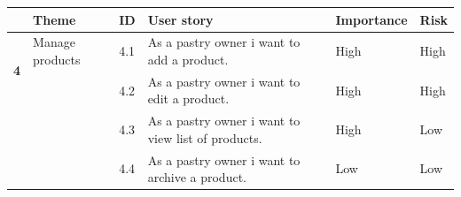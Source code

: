 \documentclass[12pt,a4paper]{report}
\begin{document}
	\begin{table}[H]
		\begin{center}
			\captionsetup[table]{skip=10pt}
			\setlength\doublerulesep{0.5pt}
			\begin{tabular}{|  p{1cm}|  p{4cm}|  p{1cm}| p{5cm}|  p{2cm}| p{2cm}|}
				\hline 
				\rowcolor{LightCyan}
				\textbf{ } & \textbf{Theme} & \textbf{ID} & \textbf{User story} & \textbf{Importance} & \textbf{Risk} 
				\\ \hline
				\multirow{2}{*}{\textbf{4} }
				&                        
				Manage products &                        
				4.1 &                        
				As a pastry owner i want to add a product.&                        
				High &                        
				High
				\\
				\cline{3-6}
				&                        
				&                        
				4.2 &                        
				As a pastry owner i want to edit a product.&                        
				High &                        
				High
				\\
				\cline{3-6}
				&                        
				&                        
				4.3 &                        
				As a pastry owner i want to view list of products.&                        
				High &                        
				Low
				\\
				\cline{3-6}
				&                        
				&                        
				4.4 &                        
				As a pastry owner i want to archive a product.&                        
				Low &                        
				Low
				

\end{tabular}
\end{center}
\end{table}
\end{document}
